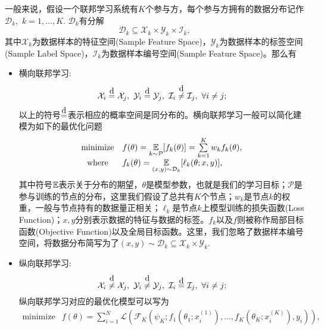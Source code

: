 一般来说，假设一个联邦学习系统有$K$个参与方，每个参与方拥有的数据分布记作$\mathcal{D}_k,$ $k = 1, \ldots, K.$ $\mathcal{D}_k$有分解
\begin{equation*}
\mathcal{D}_k \subseteq \mathcal{X}_k \times \mathcal{Y}_k \times \mathcal{I}_k,
\end{equation*}
其中$\mathcal{X}_k$为数据样本的特征空间(Sample Feature Space)，$\mathcal{Y}_k$为数据样本的标签空间(Sample Label Space)，$\mathcal{I}_k$为数据样本编号空间(Sample Feature Space)。那么有\cite{Yang_2019_VFL,vfl}
\begin{itemize}
\item 横向联邦学习:
\begin{equation*}
\mathcal{X}_i \eqabove{d} \mathcal{X}_j, ~ \mathcal{Y}_i \eqabove{d} \mathcal{Y}_j, ~ \mathcal{I}_i \neqabove{d} \mathcal{I}_j, ~ \forall i \neq j;
\end{equation*}
以上的符号$\eqabove{d}$表示相应的概率空间是同分布的。横向联邦学习一般可以简化建模为如下的最优化问题\cite{kairouz2019advances_fl}
\begin{equation}
\label{eq:general-hfl}
\begin{array}{cl}
\text{minimize} & f(\theta) = \operatorname*{\mathbb{E}}\limits_{k \sim {\mathcal{P}}} [f_k(\theta)] = \sum\limits_{k=1}^K w_k f_k(\theta), \\
\text{where} & f_k(\theta) = \operatorname*{\mathbb{E}}\limits_{(x, y) \sim \mathcal{D}_k} [\ell_k(\theta; x, y)],
\end{array}
\end{equation}
其中符号$\operatorname*{\mathbb{E}}$表示关于分布的期望，$\theta$是模型参数，也就是我们的学习目标；$\mathcal{P}$是参与训练的节点的分布，这里我们假设了总共有$K$个节点；$w_k$是节点$k$的权重，一般与节点持有的数据量正相关；$\ell_k$是节点$k$上模型训练的损失函数(Loss Function)；$x, y$分别表示数据的特征与数据的标签。$f_k$以及$f$则被称作局部目标函数(Objective Function)以及全局目标函数。这里，我们忽略了数据样本编号空间，将数据分布简写为了$(x, y) \sim \mathcal{D}_k \subseteq \mathcal{X}_k \times \mathcal{Y}_k.$
\item 纵向联邦学习:
\begin{equation*}
\mathcal{X}_i \neqabove{d} \mathcal{X}_j, ~ \mathcal{Y}_i \neqabove{d} \mathcal{Y}_j, ~ \mathcal{I}_i \eqabove{d} \mathcal{I}_j, ~ \forall i \neq j;
\end{equation*}
纵向联邦学习对应的最优化模型可以写为\cite{vfl}
\begin{equation}
\label{eq:general-vfl}
\begin{array}{cl}
\text{minimize} & f(\theta) = \sum\limits_{i=1}^N \mathcal{L} \left( \mathcal{F}_K \left( \psi_K; f_{1}(\theta_{1}; x_{i}^{(1)}), \ldots, f_{K}(\theta_{K}; x_{i}^{(K)}), y_{i} \right) \right), \\

\end{array}
\end{equation}
\end{itemize}
